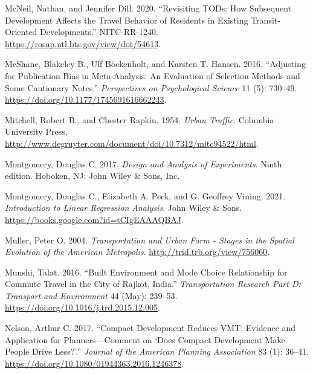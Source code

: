 \documentclass[
  11pt,
  openany]{memoir}
\newlength{\cslhangindent}
\newlength{\cslentryspacingunit} %
\newenvironment{CSLReferences}[2] %
 {%
  \setlength{\parindent}{0pt}
  \ifodd #1
  \let\oldpar\par
  \def\par{\hangindent=\cslhangindent\oldpar}
  \fi
  \setlength{\parskip}{#2\cslentryspacingunit}
 }%
 {}
\begin{document}
\begin{CSLReferences}{1}{0}
\leavevmode{}%
McNeil, Nathan, and Jennifer Dill. 2020. {``Revisiting {TODs}: How {Subsequent Development Affects} the {Travel Behavior} of {Residents} in {Existing Transit}-{Oriented Developments}.''} NITC-RR-1240. \url{https://rosap.ntl.bts.gov/view/dot/54613}.

\leavevmode{}%
McShane, Blakeley B., Ulf Böckenholt, and Karsten T. Hansen. 2016. {``Adjusting for {Publication Bias} in {Meta}-{Analysis}: An {Evaluation} of {Selection Methods} and {Some Cautionary Notes}.''} \emph{Perspectives on Psychological Science} 11 (5): 730--49. \url{https://doi.org/10.1177/1745691616662243}.

\leavevmode{}%
Mitchell, Robert B., and Chester Rapkin. 1954. \emph{Urban {Traffic}}. {Columbia University Press}. \url{http://www.degruyter.com/document/doi/10.7312/mitc94522/html}.

\leavevmode{}%
Montgomery, Douglas C. 2017. \emph{Design and Analysis of Experiments}. Ninth edition. {Hoboken, NJ}: {John Wiley \& Sons, Inc}.

\leavevmode{}%
Montgomery, Douglas C., Elizabeth A. Peck, and G. Geoffrey Vining. 2021. \emph{Introduction to {Linear Regression Analysis}}. {John Wiley \& Sons}. \url{https://books.google.com?id=tCIgEAAAQBAJ}.

\leavevmode{}%
Muller, Peter O. 2004. \emph{Transportation and {Urban Form} - {Stages} in the {Spatial Evolution} of the {American Metropolis}}. \url{http://trid.trb.org/view/756060}.

\leavevmode{}%
Munshi, Talat. 2016. {``Built Environment and Mode Choice Relationship for Commute Travel in the City of {Rajkot}, {India}.''} \emph{Transportation Research Part D: Transport and Environment} 44 (May): 239--53. \url{https://doi.org/10.1016/j.trd.2015.12.005}.

\leavevmode{}%
Nelson, Arthur C. 2017. {``Compact {Development Reduces VMT}: Evidence and {Application} for {Planners}---{Comment} on {`{Does Compact Development Make People Drive Less}?'}.''} \emph{Journal of the American Planning Association} 83 (1): 36--41. \url{https://doi.org/10.1080/01944363.2016.1246378}.


\end{CSLReferences}
\end{document}
